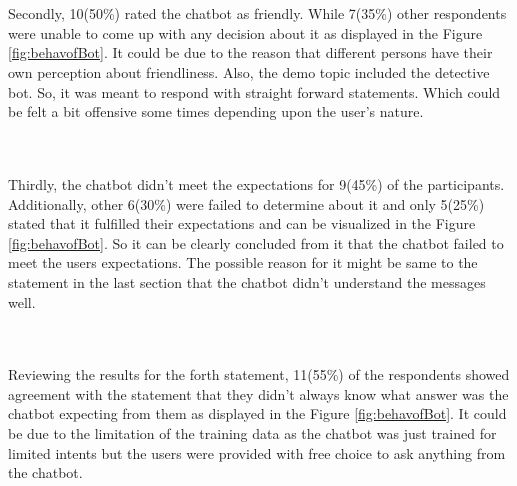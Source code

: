 \\~\\
Secondly, 10(50\%) rated the chatbot as friendly. While 7(35\%) other respondents were unable to come up with any decision about it as displayed in the Figure \ref{fig:behavofBot}. It could be due to the reason that different persons have their own perception about friendliness. Also, the demo topic included the detective bot. So, it was meant to respond with straight forward statements. Which could be felt a bit offensive some times depending upon the user's nature. 

\\~\\
Thirdly, the chatbot didn't meet the expectations for 9(45\%) of the participants. Additionally, other 6(30\%) were failed to determine about it and only 5(25\%) stated that it fulfilled their expectations and can be visualized in the Figure \ref{fig:behavofBot}. So it can be clearly concluded from it that the chatbot failed to meet the users expectations. The possible reason for it might be same to the statement in the last section that the chatbot didn't understand the messages well.

\\~\\
Reviewing the results for the forth statement, 11(55\%) of the respondents showed agreement with the statement that they didn't always know what answer was the chatbot expecting from them as displayed in the Figure \ref{fig:behavofBot}. It could be due to the limitation of the training data as the chatbot was just trained for limited intents but the users were provided with free choice to ask anything from the chatbot. 

